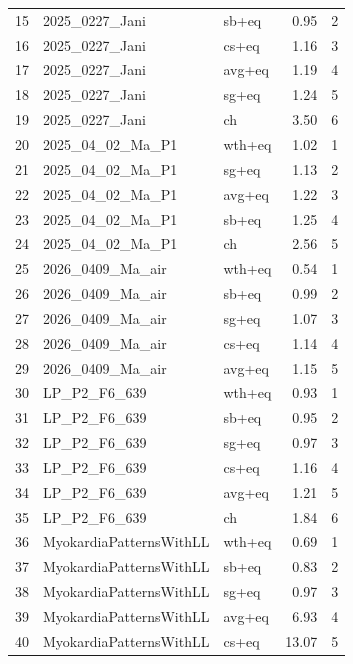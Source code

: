 \documentclass{article}
\begin{document}
\begin{table}[ht]
\begin{tabular}{lllrr}
15 & 2025\_0227\_Jani           & sb+eq  & 0.95     & 2 \\
16 & 2025\_0227\_Jani           & cs+eq  & 1.16     & 3 \\
17 & 2025\_0227\_Jani           & avg+eq & 1.19     & 4 \\
18 & 2025\_0227\_Jani           & sg+eq  & 1.24     & 5 \\
19 & 2025\_0227\_Jani           & ch     & 3.50     & 6 \\
20 & 2025\_04\_02\_Ma\_P1         & wth+eq & 1.02     & 1 \\
21 & 2025\_04\_02\_Ma\_P1         & sg+eq  & 1.13     & 2 \\
22 & 2025\_04\_02\_Ma\_P1         & avg+eq & 1.22     & 3 \\
23 & 2025\_04\_02\_Ma\_P1         & sb+eq  & 1.25     & 4 \\
24 & 2025\_04\_02\_Ma\_P1         & ch     & 2.56     & 5 \\
25 & 2026\_0409\_Ma\_air         & wth+eq & 0.54     & 1 \\
26 & 2026\_0409\_Ma\_air         & sb+eq  & 0.99     & 2 \\
27 & 2026\_0409\_Ma\_air         & sg+eq  & 1.07     & 3 \\
28 & 2026\_0409\_Ma\_air         & cs+eq  & 1.14     & 4 \\
29 & 2026\_0409\_Ma\_air         & avg+eq & 1.15     & 5 \\
30 & LP\_P2\_F6\_639              & wth+eq & 0.93     & 1 \\
31 & LP\_P2\_F6\_639              & sb+eq  & 0.95     & 2 \\
32 & LP\_P2\_F6\_639              & sg+eq  & 0.97     & 3 \\
33 & LP\_P2\_F6\_639              & cs+eq  & 1.16     & 4 \\
34 & LP\_P2\_F6\_639              & avg+eq & 1.21     & 5 \\
35 & LP\_P2\_F6\_639              & ch     & 1.84     & 6 \\
36 & MyokardiaPatternsWithLL   & wth+eq & 0.69     & 1 \\
37 & MyokardiaPatternsWithLL   & sb+eq  & 0.83     & 2 \\
38 & MyokardiaPatternsWithLL   & sg+eq  & 0.97     & 3 \\
39 & MyokardiaPatternsWithLL   & avg+eq & 6.93     & 4 \\
40 & MyokardiaPatternsWithLL   & cs+eq  & 13.07    & 5 \\
\bottomrule
\end{tabular}
\end{table}
\end{document}
